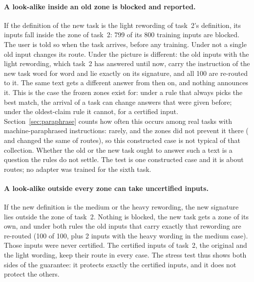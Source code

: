 \begin{table}[t]
  \caption{Stress test (routes only, T5-base word-vectors). A sixth task with SST-2 inputs and a
  reworded SST-2 definition is added after the five tasks. ``Blocked'': training
  inputs of the new task that lie inside an older zone, reported when the task arrives. ``Routes
  changed'': old test inputs of task~2 (100 per wording) that are given to a different task
  afterwards.}
  \label{tab:stress}
  \centering
  \small
  \setlength{\tabcolsep}{4pt}
  
\end{table}

\paragraph{A look-alike inside an old zone is blocked and reported.} If the definition of the new
task is the light rewording of task~2's definition, its inputs fall inside the zone of task~2: 799 of
its 800 training inputs are blocked. The user is told so when the task arrives, before any
training. Under \cert{} not a single old input changes its route. Under \nearest{} the picture is
different: the old inputs with the light rewording, which task~2 has answered until now, carry the
instruction of the new task word for word and lie exactly on its signature, and all 100 are
re-routed to it. The same text gets a different answer from then on, and nothing announces it.
This is the case the frozen zones exist for: under a rule that always picks the best match, the
arrival of a task can change answers that were given before; under the oldest-claim rule it
cannot, for a certified input. Section~\ref{sec:paraphrase} counts how often this occurs among \WidenTasksEval{} real tasks with machine-paraphrased instructions: rarely, and the zones did not prevent it there (\nearest{} and \cert{} changed the same \RerouteNearNChanged{} of \RerouteInputs{} routes), so this constructed case is not typical of that collection. Whether the old or the new task ought to answer such a text is a question the rules do not
settle. The test is one constructed case and it is about routes; no adapter was trained for the
sixth task.

\paragraph{A look-alike outside every zone can take uncertified inputs.} If the new definition is
the medium or the heavy rewording, the new signature lies outside the zone of task~2. Nothing is
blocked, the new task gets a zone of its own, and under both rules the old inputs that carry exactly
that rewording are re-routed (100 of 100, plus 2 inputs with the heavy wording in the medium case).
Those inputs were never certified. The certified inputs of task~2, the original and the light
wording, keep their route in every case. The stress test thus shows both sides of the guarantee:
it protects exactly the certified inputs, and it does not protect the others.


